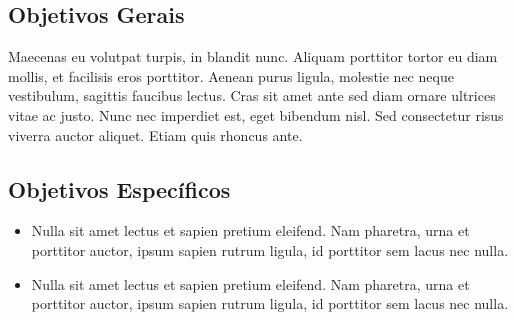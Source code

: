 \subsection{Objetivos Gerais}
Maecenas eu volutpat turpis, in blandit nunc. Aliquam porttitor tortor eu diam mollis, et facilisis eros porttitor. Aenean purus ligula, molestie nec neque vestibulum, sagittis faucibus lectus. Cras sit amet ante sed diam ornare ultrices vitae ac justo. Nunc nec imperdiet est, eget bibendum nisl. Sed consectetur risus viverra auctor aliquet. Etiam quis rhoncus ante. 
\newpage
\subsection{Objetivos Específicos}
\begin{itemize}
    \item Nulla sit amet lectus et sapien pretium eleifend. Nam pharetra, urna et porttitor auctor, ipsum sapien rutrum ligula, id porttitor sem lacus nec nulla.
    \item Nulla sit amet lectus et sapien pretium eleifend. Nam pharetra, urna et porttitor auctor, ipsum sapien rutrum ligula, id porttitor sem lacus nec nulla.
\end{itemize}